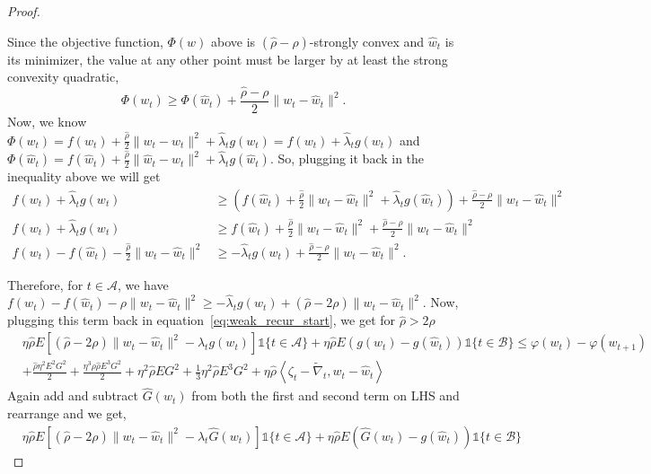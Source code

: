 \documentclass{article} %
\def\eqref#1{equation~\ref{#1}}
\def\A{{\mathcal A}}
\def\B{{\mathcal B}}
\begin{document}
\begin{proof}
\begin{itemize}
        Since the objective function, $\Phi(w)$ above is $(\hat{\rho}-\rho)$-strongly convex and $\hat{w}_t$ is its minimizer, the value at any other point must be larger by at least the strong convexity quadratic,
        $$\Phi(w_t) \ge \Phi(\hat{w}_t) + \frac{\hat{\rho}-\rho}{2}\|w_t - \hat{w}_t\|^2.$$
        Now, we know
        $\Phi(w_t) = f(w_t) + \frac{\hat{\rho}}{2}\|w_t-w_t\|^2 + \hat{\lambda}_t g(w_t) = f(w_t) + \hat{\lambda}_t g(w_t)$ and $\Phi(\hat{w}_t) = f(\hat{w}_t) + \frac{\hat{\rho}}{2}\|\hat{w}_t-w_t\|^2 + \hat{\lambda}_t g(\hat{w}_t).$ So, plugging it back in the inequality above we will get
        \begin{align*}
            f(w_t) + \hat{\lambda}_t g(w_t) &\ge \left( f(\hat{w}_t) + \frac{\hat{\rho}}{2}\|w_t - \hat{w}_t\|^2 + \hat{\lambda}_t g(\hat{w}_t) \right) + \frac{\hat{\rho}-\rho}{2}\|w_t - \hat{w}_t\|^2
            \\
            f(w_t) + \hat{\lambda}_t g(w_t)&\geq f(\hat{w}_t) + \frac{\hat{\rho}}{2}\|w_t - \hat{w}_t\|^2 + \frac{\hat{\rho}-\rho}{2}\|w_t - \hat{w}_t\|^2
            \\
            f(w_t) - f(\hat{w}_t) - \frac{\hat{\rho}}{2}\|w_t - \hat{w}_t\|^2 &\geq - \hat{\lambda}_t g(w_t) + \frac{\hat{\rho}-\rho}{2}\|w_t - \hat{w}_t\|^2.
        \end{align*}
    \end{itemize}
    Therefore, for $t \in \A$, we have $f(w_t) - f(\hat{w}_t) - \rho\|w_t - \hat{w}_t\|^2 \ge - \hat{\lambda}_t g(w_t) + (\hat{\rho}- 2\rho)\|w_t - \hat{w}_t\|^2.$ Now, plugging this term back in \eqref{eq:weak_recur_start}, we get for $\hat{\rho} > 2\rho$
    \begin{align*}
        &\eta \hat{\rho} E[(\hat{\rho}-2\rho)\|w_t - \hat{w}_t\|^2 - \hat{\lambda}_t g(w_t)]\mathds{1}\{t \in \A\} + \eta \hat{\rho} E (g(w_t) - g(\hat{w}_t))\mathds{1}\{t \in \B\} 
        \leq \varphi(w_t) - \varphi(w_{t+1}) 
        \\
        & + \frac{\hat{\rho}\eta^2 E^2 G^2}{2} + \frac{\eta^3 \rho \hat{\rho} E^3 G^2}{2} + \eta^2 \hat{\rho} E G^2 + \frac{1}{3}\eta^2 \hat{\rho} E^3 G^2 + \eta \hat{\rho} \left\langle \zeta_t - \tilde{\nabla}_t, w_t - \hat{w}_t \right\rangle
    \end{align*}
    Again add and subtract $\hat{G}(w_t)$ from both the first and second term on LHS and rearrange and we get,
    \begin{align*}
        &\eta \hat{\rho} E[(\hat{\rho}-2\rho)\|w_t - \hat{w}_t\|^2 - \hat{\lambda}_t \hat{G}(w_t)]\mathds{1}\{t \in \A\} + \eta \hat{\rho} E (\hat{G}(w_t) - g(\hat{w}_t))\mathds{1}\{t \in \B\} 

\end{align*}
\end{proof}
\end{document}
